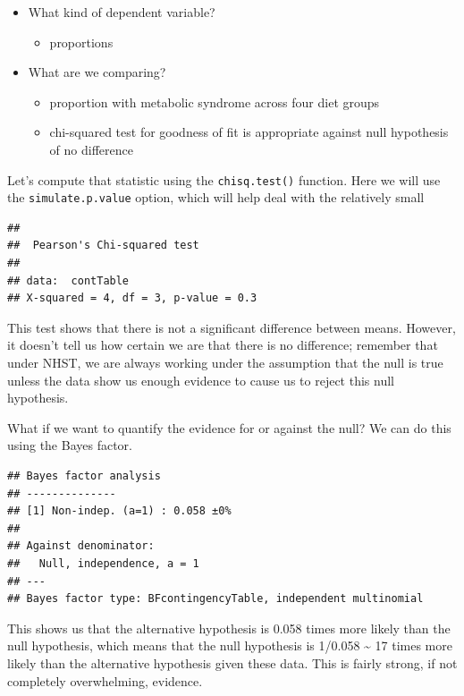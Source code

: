 \documentclass[12pt,]{book}
\providecommand{\tightlist}{%
  \setlength{\itemsep}{0pt}\setlength{\parskip}{0pt}}
\theoremstyle{definition}
\theoremstyle{definition}
\theoremstyle{definition}
\theoremstyle{remark}
\begin{document}
\begin{itemize}
\tightlist
\item
  What kind of dependent variable?

  \begin{itemize}
  \tightlist
  \item
    proportions
  \end{itemize}
\item
  What are we comparing?

  \begin{itemize}
  \tightlist
  \item
    proportion with metabolic syndrome across four diet groups
  \item
    chi-squared test for goodness of fit is appropriate against null hypothesis of no difference
  \end{itemize}
\end{itemize}

Let's compute that statistic using the \texttt{chisq.test()} function. Here we will use the \texttt{simulate.p.value} option, which will help deal with the relatively small

\begin{verbatim}
## 
##  Pearson's Chi-squared test
## 
## data:  contTable
## X-squared = 4, df = 3, p-value = 0.3
\end{verbatim}

This test shows that there is not a significant difference between means. However, it doesn't tell us how certain we are that there is no difference; remember that under NHST, we are always working under the assumption that the null is true unless the data show us enough evidence to cause us to reject this null hypothesis.

What if we want to quantify the evidence for or against the null? We can do this using the Bayes factor.

\begin{verbatim}
## Bayes factor analysis
## --------------
## [1] Non-indep. (a=1) : 0.058 ±0%
## 
## Against denominator:
##   Null, independence, a = 1 
## ---
## Bayes factor type: BFcontingencyTable, independent multinomial
\end{verbatim}

This shows us that the alternative hypothesis is 0.058 times more likely than the null hypothesis, which means that the null hypothesis is 1/0.058 \textasciitilde{} 17 times more likely than the alternative hypothesis given these data. This is fairly strong, if not completely overwhelming, evidence.
\end{document}
